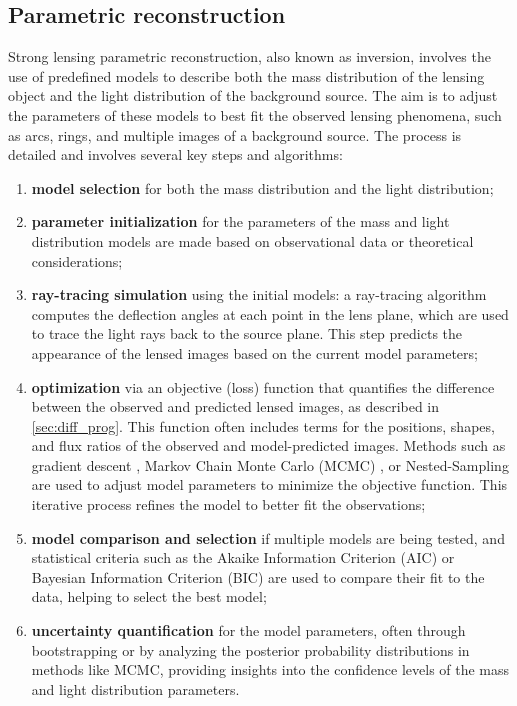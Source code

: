 \subsection{Parametric reconstruction}
\label{subsec:parametric_reconstruction}
Strong lensing parametric reconstruction, also known as inversion, involves the use of predefined models to describe both the mass distribution of the lensing object and the light distribution of the background source. The aim is to adjust the parameters of these models to best fit the observed lensing phenomena, such as arcs, rings, and multiple images of a background source. The process is detailed and involves several key steps and algorithms:
\begin{enumerate}
    \item \textbf{model selection} for both the mass distribution and the light distribution;
    \item \textbf{parameter initialization} for the parameters of the mass and light distribution models are made based on observational data or theoretical considerations;
    \item \textbf{ray-tracing simulation} using the initial models: a ray-tracing algorithm computes the deflection angles at each point in the lens plane, which are used to trace the light rays back to the source plane. This step predicts the appearance of the lensed images based on the current model parameters;
    \item \textbf{optimization} via an objective (loss) function that quantifies the difference between the observed and predicted lensed images, as described in \cref{sec:diff_prog}. This function often includes terms for the positions, shapes, and flux ratios of the observed and model-predicted images. Methods such as gradient descent \citep{ruder_overview_2016,canu_introduction_2016}, Markov Chain Monte Carlo (MCMC) \citep{geyer_practical_1992,speagle_conceptual_2019}, or Nested-Sampling \citep{skilling_nested_2004,buchner_nested_2023} are used to adjust model parameters to minimize the objective function. This iterative process refines the model to better fit the observations;
    \item \textbf{model comparison and selection} if multiple models are being tested, and statistical criteria such as the Akaike Information Criterion (AIC) \citep{cavanaugh_akaike_2019} or Bayesian Information Criterion (BIC) \citep{liddle_information_2007,chen_extended_2008} are used to compare their fit to the data, helping to select the best model;
    \item \textbf{uncertainty quantification} for the model parameters, often through bootstrapping or by analyzing the posterior probability distributions in methods like MCMC, providing insights into the confidence levels of the mass and light distribution parameters.
\end{enumerate}


